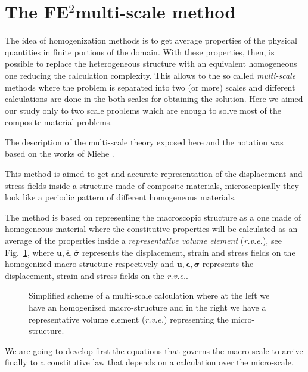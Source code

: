 \documentclass[review]{elsarticle}
\newcommand{\fe}{FE$^2$}
\begin{document}
\section{The \fe multi-scale method}

The idea of homogenization methods is to get average properties of the physical
quantities in finite portions of the domain. With these properties, then, is 
possible to replace the heterogeneous structure with an equivalent homogeneous
one reducing the calculation complexity. This allows to the so called
\emph{multi-scale} methods where the problem is separated into two (or more)
scales and different calculations are done in the both scales
for obtaining the solution. Here we aimed our study only to two scale problems
which are enough to solve most of the composite material problems.

The description of the multi-scale theory exposed here and the 
notation was based on the works of Miehe \cite{miehe2002}.

This method is aimed to get and accurate representation of the displacement 
and stress fields inside a structure made of composite materials, microscopically
they look like a periodic pattern of different homogeneous materials.

The method is based on representing the macroscopic structure as a one made of 
homogeneous material where the constitutive properties will be calculated as an 
average of the properties inside a \emph{representative volume element} (\emph{r.v.e.}),
see Fig.~\ref{fig:multi-scale}, where 
$\overline{\bm{u}}, \overline{\bm{\epsilon}}, \overline{\bm{\sigma}}$
represents the displacement, strain and stress fields on the homogenized
macro-structure respectively and
${\bm{u}}, {\bm{\epsilon}}, {\bm{\sigma}}$
represents the displacement, strain and stress fields on the \emph{r.v.e.}.

\begin{figure}[!ht]
\resizebox{8cm}{!}{}
\caption{\label{fig:multi-scale}Simplified scheme of a multi-scale calculation 
where at the left we have an homogenized macro-structure and 
in the right we have a representative volume element (\emph{r.v.e.}) 
representing the micro-structure.}
\end{figure}

We are going to develop first the equations that governs the macro scale
to arrive finally to a constitutive law that depends on a calculation over the
micro-scale.
\end{document}
